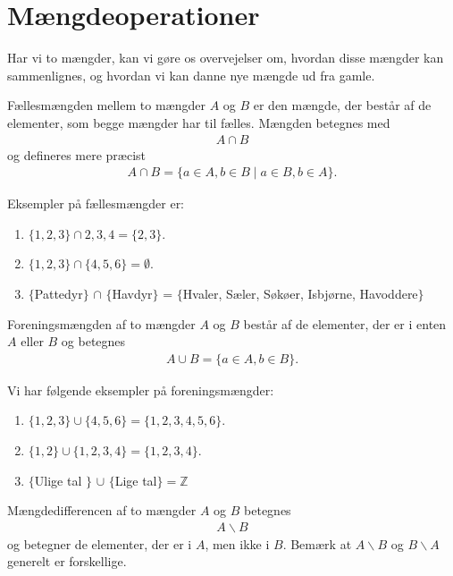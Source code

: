 \section*{Mængdeoperationer}
Har vi to mængder, kan vi gøre os overvejelser om, hvordan disse mængder kan sammenlignes, og hvordan vi kan danne nye mængde ud fra gamle. 
\begin{defn}[Fællesmængde]
Fællesmængden mellem to mængder $A$ og $B$ er den mængde, der består af de elementer, som begge mængder har til fælles. Mængden betegnes med
\begin{align*}
A\cap B
\end{align*}
og defineres mere præcist
\begin{align*}
A\cap B = \{a\in A, b\in B \mid a\in B, b\in A\}.
\end{align*}
\end{defn}

\begin{exa}
Eksempler på fællesmængder er:
\begin{enumerate}[label=\roman*)]
\item $\{1,2,3\} \cap {2,3,4} = \{2,3\}$.
\item $\{1,2,3\} \cap \{4,5,6\} = \emptyset$.
\item      $\{$Pattedyr$\}$ $\cap$ $\{$Havdyr$\}$ = $\{$Hvaler, Sæler, Søkøer, Isbjørne, Havoddere$\}$
\end{enumerate}
\end{exa}

\begin{defn}[Foreningsmængde]
Foreningsmængden af to mængder $A$ og $B$ består af de elementer, der er i enten $A$ eller $B$ og betegnes
\begin{align*}
A\cup B = \{a\in A, b\in B\}.
\end{align*}
\end{defn}
\begin{exa}
Vi har følgende eksempler på foreningsmængder:
\begin{enumerate}[label=\roman*)]
\item $\{1,2,3\} \cup \{4,5,6\} = \{1,2,3,4,5,6\}$.
\item $\{1,2\} \cup \{1,2,3,4\} = \{1,2,3,4\}$.
\item $\{$Ulige tal $\}$ $\cup$ $\{$Lige tal$\}=\mathbb{Z}$ 
\end{enumerate}
\end{exa}
\begin{defn}
Mængdedifferencen af to mængder $A$ og $B$ betegnes
\begin{align*}
A \backslash B
\end{align*}
og betegner de elementer, der er i $A$, men ikke i $B$. Bemærk at $A\backslash B$ og $B \backslash A$ generelt er forskellige.
\end{defn}


